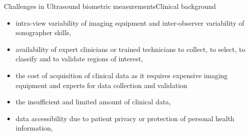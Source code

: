 {
\begin{frame}{Challenges in Ultrasound biometric measurements}{Clinical background}

\begin{itemize}
\item intra-view variability of imaging equipment and inter-observer variability of sonographer skills,
\item availability of expert clinicians or trained technicians to collect, to select, to classify and to validate regions of interest,
\item the cost of acquisition of clinical data as it requires expensive imaging equipment and experts for data collection and validation
\item the insufficient and limited amount of clinical data,
\item data accessibility due to patient privacy or protection of personal health information,
\end{itemize}

\end{frame}
}






